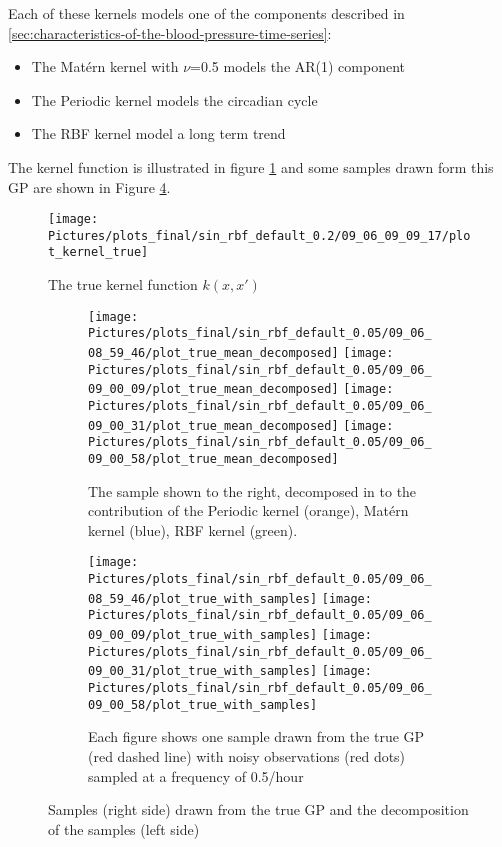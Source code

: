 Each of these kernels models one of the components described in
\ref{sec:characteristics-of-the-blood-pressure-time-series}:
\begin{itemize}
    \item The Matérn kernel with $\nu$=0.5 models the AR(1) component
    \item The Periodic kernel models the circadian cycle
    \item The RBF kernel model a long term trend
\end{itemize}

The kernel function is illustrated in figure \ref{fig:true_kernel} and
some samples drawn form this GP are shown in Figure \ref{fig:true_gp_samples}.

\begin{figure}
    \centering
    \texttt{[image: Pictures/plots\_final/sin\_rbf\_default\_0.2/09\_06\_09\_09\_17/plot\_kernel\_true]}
    \caption{The true kernel function $k(x,x')$}
    \label{fig:true_kernel}
\end{figure}

\begin{figure}
\centering
\begin{subfigure}{.45\textwidth}
    \centering
    \texttt{[image: Pictures/plots\_final/sin\_rbf\_default\_0.05/09\_06\_08\_59\_46/plot\_true\_mean\_decomposed]}
    \texttt{[image: Pictures/plots\_final/sin\_rbf\_default\_0.05/09\_06\_09\_00\_09/plot\_true\_mean\_decomposed]}
    \texttt{[image: Pictures/plots\_final/sin\_rbf\_default\_0.05/09\_06\_09\_00\_31/plot\_true\_mean\_decomposed]}
    \texttt{[image: Pictures/plots\_final/sin\_rbf\_default\_0.05/09\_06\_09\_00\_58/plot\_true\_mean\_decomposed]}
  \caption{The sample shown to the right, decomposed in to the contribution of the Periodic kernel (orange),
      Matérn kernel (blue), RBF kernel (green).}
  \label{fig:true_mean_decomposed}
\end{subfigure}\hfill
\begin{subfigure}{.45\textwidth}
    \centering
    \texttt{[image: Pictures/plots\_final/sin\_rbf\_default\_0.05/09\_06\_08\_59\_46/plot\_true\_with\_samples]}
    \texttt{[image: Pictures/plots\_final/sin\_rbf\_default\_0.05/09\_06\_09\_00\_09/plot\_true\_with\_samples]}
    \texttt{[image: Pictures/plots\_final/sin\_rbf\_default\_0.05/09\_06\_09\_00\_31/plot\_true\_with\_samples]}
    \texttt{[image: Pictures/plots\_final/sin\_rbf\_default\_0.05/09\_06\_09\_00\_58/plot\_true\_with\_samples]}
  \caption{Each figure shows one sample drawn from the true GP (red dashed line) with noisy observations
      (red dots) sampled at a frequency of 0.5/hour}
  \label{fig:sub2}
\end{subfigure}
\caption{Samples (right side) drawn from the true GP and the decomposition of the samples (left side)}
\label{fig:true_gp_samples}
\end{figure}

